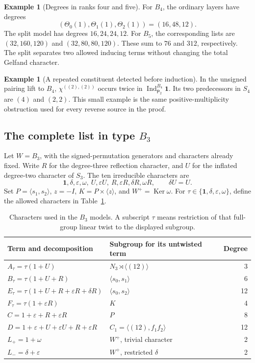 \documentclass[11pt]{article}
\numberwithin{equation}{section}
\theoremstyle{definition}
\newtheorem{example}[theorem]{Example}
\DeclareMathOperator{\Ind}{Ind}
\DeclareMathOperator{\Ker}{Ker}
\newcommand{\ee}{\varepsilon}
\newcommand{\dd}{\delta}
\newcommand{\om}{\omega}
\newcommand{\one}{\mathbf 1}
\newcommand{\pair}{\mathsf P}
\begin{document}
\begin{example}[Degrees in ranks four and five]
For \(B_4\), the ordinary layers have degrees
\[
 (\Theta_0(1),\Theta_1(1),\Theta_2(1))=(16,48,12).
\]
The split model has degrees \(16,24,24,12\).
For \(B_5\), the corresponding lists are
\((32,160,120)\) and \((32,80,80,120)\).
These sum to \(76\) and \(312\), respectively.
The split separates two allowed inducing terms without changing the total Gelfand character.
\end{example}

\begin{example}[A repeated constituent detected before induction]
In the unsigned pairing lift to \(B_4\),
\(\chi^{((2),(2))}\) occurs twice in \(\Ind_{\pair_2}^{B_4}\one\).
Its two predecessors in \(S_4\) are \((4)\) and \((2,2)\).
This small example is the same positive-multiplicity obstruction used for every reverse source in the proof.
\end{example}

\subsection{The complete list in type \texorpdfstring{\(B_3\)}{B3}}
\label{subsec:B3classification}


Let \(W=B_3\), with the signed-permutation generators and characters already fixed.
Write \(R\) for the degree-three reflection character, and \(U\) for the inflated degree-two character of \(S_3\).
The ten irreducible characters are
\[
 \one,\dd,\ee,\om,\ U,\ee U,\ R,\ee R,\dd R,\om R ,
 \qquad\dd U=U .
\]
Set \(P=\langle s_1,s_2\rangle\), \(z=-I\), \(K=P\times\langle z\rangle\), and \(W^+=\Ker\om\).
For \(\tau\in\{\one,\dd,\ee,\om\}\), define the allowed characters in Table~\ref{tab:B3terms}.

\begin{table}[htbp]
\centering\small
\begin{tabular}{llr}
\toprule
Term and decomposition&Subgroup for its untwisted term&Degree\\
\midrule
\(A_\tau=\tau(1+U)\)&\(N_3\rtimes\langle(12)\rangle\)&3\\
\(B_\tau=\tau(1+U+R)\)&\(\langle s_0,s_1\rangle\)&6\\
\(E_\tau=\tau(1+U+R+\ee R+\dd R)\)&\(\langle s_0,s_2\rangle\)&12\\
\(F_\tau=\tau(1+\ee R)\)&\(K\)&4\\
\(C=1+\ee+R+\ee R\)&\(P\)&8\\
\(D=1+\ee+U+\ee U+R+\ee R\)&\(C_1=\langle(12),f_1f_2\rangle\)&12\\
\(L_+=1+\om\)&\(W^+\), trivial character&2\\
\(L_-=\dd+\ee\)&\(W^+\), restricted \(\dd\)&2\\
\bottomrule
\end{tabular}
\caption{Characters used in the \(B_3\) models. A subscript \(\tau\) means restriction of that full-group linear twist to the displayed subgroup.}
\label{tab:B3terms}
\end{table}
\end{document}
